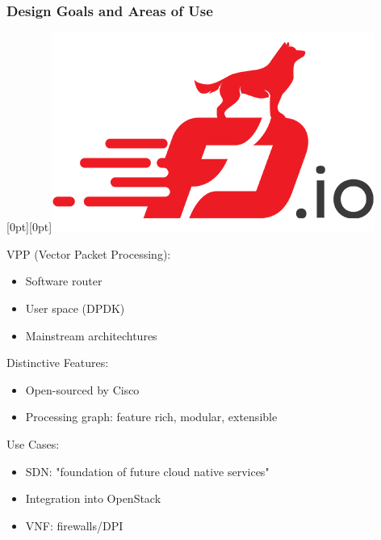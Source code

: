 \begin{frame}
    \frametitle{Design Goals and Areas of Use}
    


    \mbox{}\hfill\raisebox{-\height}[0pt][0pt]{\includegraphics[width=.15\linewidth]{pics/logo_fdio.png}}

    VPP (Vector Packet Processing): 
    \begin{itemize}
        \item Software router
        \item User space (DPDK)
        \item Mainstream architechtures
    \end{itemize}
    \pause

    Distinctive Features: %
    \begin{itemize}
        \item Open-sourced by Cisco \cite{vppwiki:whatis}
        \item Processing graph: feature rich, modular, extensible \cite{linguaglossa2017high}
    \end{itemize}
    \pause

    Use Cases:
    \begin{itemize}
        \item SDN: "foundation of future cloud native services" \cite{florincoras}
        \item Integration into OpenStack \cite{fdio:integration}
        \item VNF: firewalls/DPI \cite{qosmos}\cite{cisco:sdn}
    \end{itemize}

\end{frame}

